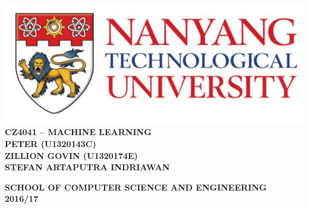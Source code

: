 \begin{titlepage}
	\begin{center}
		
		\includegraphics[width=1\textwidth]{./ntu_logo.png}
		\\[5cm]
		
		\uppercase{\textbf{CZ4041 -- MACHINE LEARNING}}
		\\[5cm]
		
		\uppercase{
			\textbf{
				PETER (U1320143C)
				\\
				ZILLION GOVIN (U1320174E)
				\\
				STEFAN ARTAPUTRA INDRIAWAN
		}}	
		
		\vfill
		
		\textsc{\bfseries SCHOOL OF COMPUTER SCIENCE AND ENGINEERING}
		\\
		\textbf{2016/17}
		
	\end{center}
\end{titlepage}
